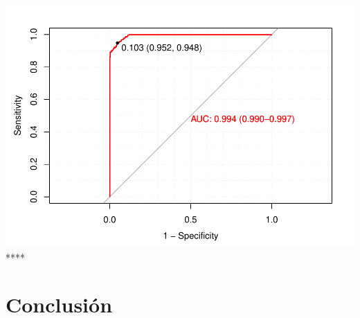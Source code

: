 \documentclass[
]{article}
\begin{document}
\includegraphics{practica2_files/figure-latex/unnamed-chunk-94-1.pdf}
****

\newpage

\hypertarget{conclusiuxf3n}{%
\section{Conclusión}\label{conclusiuxf3n}}
\end{document}
